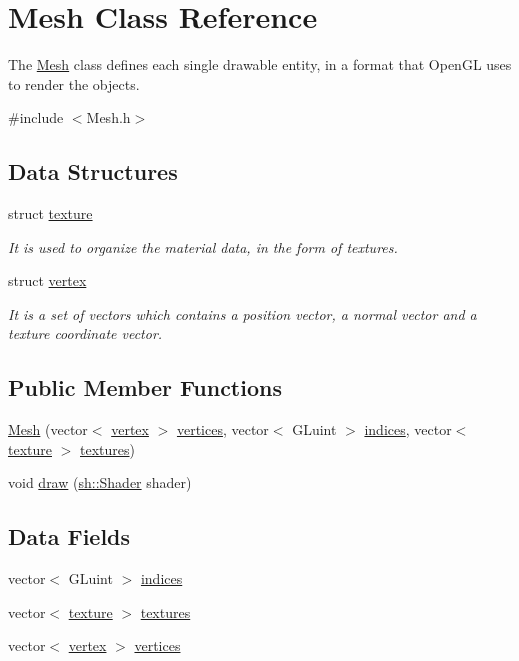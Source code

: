 \hypertarget{classMesh}{}\section{Mesh Class Reference}
\label{classMesh}


The \hyperlink{classMesh}{Mesh} class defines each single drawable entity, in a format that Open\+GL uses to render the objects.  




{\ttfamily \#include $<$Mesh.\+h$>$}

\subsection*{Data Structures}
\begin{DoxyCompactItemize}
\item 
struct \hyperlink{structMesh_1_1texture}{texture}
\begin{DoxyCompactList}\small\item\em It is used to organize the material data, in the form of textures. \end{DoxyCompactList}\item 
struct \hyperlink{structMesh_1_1vertex}{vertex}
\begin{DoxyCompactList}\small\item\em It is a set of vectors which contains a position vector, a normal vector and a texture coordinate vector. \end{DoxyCompactList}\end{DoxyCompactItemize}
\subsection*{Public Member Functions}
\begin{DoxyCompactItemize}
\item 
\hyperlink{classMesh_a9c8095febd970ba37c3739091d452f78}{Mesh} (vector$<$ \hyperlink{structMesh_1_1vertex}{vertex} $>$ \hyperlink{classMesh_a57fc8cde81bbaa1317983a29b5647e26}{vertices}, vector$<$ G\+Luint $>$ \hyperlink{classMesh_a233e40975b5ddafda502c8c31b77db2c}{indices}, vector$<$ \hyperlink{structMesh_1_1texture}{texture} $>$ \hyperlink{classMesh_aa154a7fb2e174902c1d2ebf0755261a0}{textures})
\item 
void \hyperlink{classMesh_a2d2ae2eec57107db43d9d01b649acd61}{draw} (\hyperlink{classsh_1_1Shader}{sh\+::\+Shader} shader)
\end{DoxyCompactItemize}
\subsection*{Data Fields}
\begin{DoxyCompactItemize}
\item 
vector$<$ G\+Luint $>$ \hyperlink{classMesh_a233e40975b5ddafda502c8c31b77db2c}{indices}
\item 
vector$<$ \hyperlink{structMesh_1_1texture}{texture} $>$ \hyperlink{classMesh_aa154a7fb2e174902c1d2ebf0755261a0}{textures}
\item 
vector$<$ \hyperlink{structMesh_1_1vertex}{vertex} $>$ \hyperlink{classMesh_a57fc8cde81bbaa1317983a29b5647e26}{vertices}
\end{DoxyCompactItemize}
